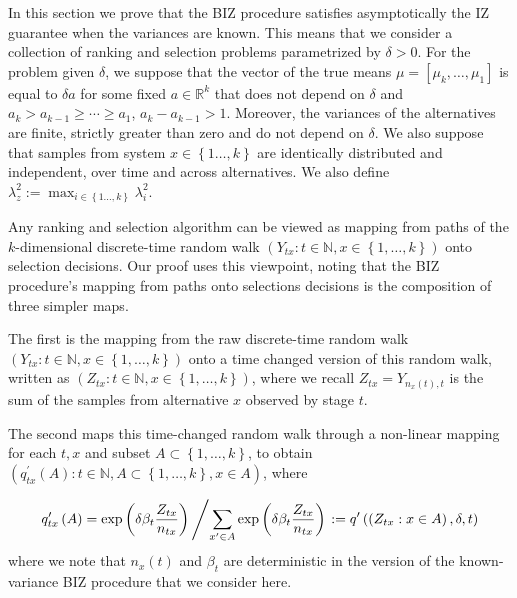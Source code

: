 \documentclass{wscpaperproc}
\theoremstyle{wsc}
\begin{document}
In this section we prove that the BIZ procedure satisfies asymptotically the IZ guarantee
when the variances are known. This means that we consider a collection of
ranking and selection problems parametrized by $\delta>0$.  
For the problem given $\delta$, we suppose that the vector of the true means
$\mu=\left[\mu_{k},\ldots,\mu_{1}\right]$ is equal to $\delta a$ for some fixed $a\in\mathbb{R}^{k}$ that
does not depend on $\delta$ and $a_{k}>a_{k-1}\geq \cdots \geq a_{1}$, $a_{k}-a_{k-1}>1$.
Moreover, the variances of the alternatives are finite, strictly greater than zero and do not depend on $\delta$.
We also suppose that samples from system $x\in\left\{ 1\ldots,k\right\} $ are identically distributed
and independent, over time and across alternatives. We also define
$\lambda_{z}^{2}:=\max_{i\in\left\{ 1\ldots,k\right\} }\lambda_{i}^{2}$.

Any ranking and selection algorithm can be viewed as mapping from
paths of the $k$-dimensional discrete-time random walk $\left(Y_{tx}:t\in\mathbb{N},x\in\left\{ 1,\ldots,k\right\} \right)$
onto selection decisions. 
Our proof uses this viewpoint, noting that 
the BIZ procedure's mapping from paths onto
selections decisions is the composition of three
simpler maps.

The first is the mapping from the raw discrete-time random walk $\left(Y_{tx}:t\in\mathbb{N},x\in\left\{ 1,\ldots,k\right\} \right)$
onto a time changed version of this random walk, written as $\left(Z_{tx}:t\in\mathbb{N},x\in\left\{ 1,\ldots,k\right\} \right)$,
where we recall $Z_{tx}=Y_{n_{x}\left(t\right),t}$ is the sum of
the samples from alternative $x$ observed by stage $t$.

The second maps this time-changed random walk through a non-linear
mapping for each $t,x$ and subset $A\subset\left\{ 1,\ldots,k\right\} $,
to obtain $\left(q_{tx}^{'}\left(A\right):t\in\mathbb{N},A\subset\left\{ 1,\ldots,k\right\} ,x\in A\right)$,
where

\[
q'_{tx}\left(A\right)=\mbox{exp}\left(\delta\beta_{t}\frac{Z_{tx}}{n_{tx}}\right)\left/\sum_{x'\in A}\mbox{exp}\left(\delta\beta_{t}\frac{Z_{tx}}{n_{tx}}\right)\right.:=q'\left(\left(Z_{tx}:x\in A\right),\delta,t\right)
\]
where we note that $n_{x}\left(t\right)$ and $\beta_{t}$ are deterministic
in the version of the known-variance BIZ procedure that we consider
here.
\end{document}
